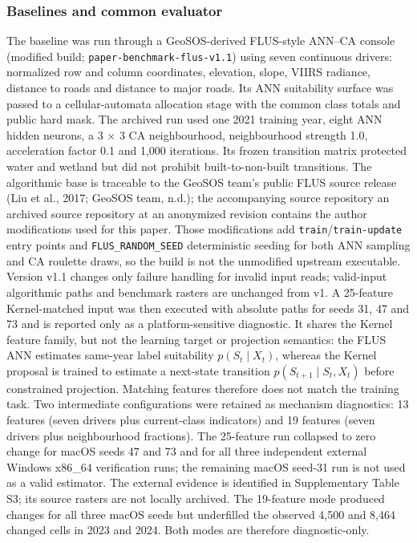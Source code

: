 \documentclass[
]{article}
\begin{document}
\subsubsection{Baselines and common
evaluator}\label{baselines-and-common-evaluator}

The baseline was run through a GeoSOS-derived FLUS-style ANN--CA console
(modified build; \texttt{paper-benchmark-flus-v1.1}) using seven
continuous drivers: normalized row and column coordinates, elevation,
slope, VIIRS radiance, distance to roads and distance to major roads.
Its ANN suitability surface was passed to a cellular-automata allocation
stage with the common class totals and public hard mask. The archived
run used one 2021 training year, eight ANN hidden neurons, a 3 × 3 CA
neighbourhood, neighbourhood strength 1.0, acceleration factor 0.1 and
1,000 iterations. Its frozen transition matrix protected water and
wetland but did not prohibit built-to-non-built transitions. The
algorithmic base is traceable to the GeoSOS team's public FLUS source
release (Liu et al., 2017; GeoSOS team, n.d.); the accompanying source
repository an archived source repository at an anonymized revision
contains the author modifications used for this paper. Those
modifications add \texttt{train}/\texttt{train-update} entry points and
\texttt{FLUS\_RANDOM\_SEED} deterministic seeding for both ANN sampling
and CA roulette draws, so the build is not the unmodified upstream
executable. Version v1.1 changes only failure handling for invalid input
reads; valid-input algorithmic paths and benchmark rasters are unchanged
from v1. A 25-feature Kernel-matched input was then executed with
absolute paths for seeds 31, 47 and 73 and is reported only as a
platform-sensitive diagnostic. It shares the Kernel feature family, but
not the learning target or projection semantics: the FLUS ANN estimates
same-year label suitability \(p(S_t\mid X_t)\), whereas the Kernel
proposal is trained to estimate a next-state transition
\(p(S_{t+1}\mid S_t,X_t)\) before constrained projection. Matching
features therefore does not match the training task. Two intermediate
configurations were retained as mechanism diagnostics: 13 features
(seven drivers plus current-class indicators) and 19 features (seven
drivers plus neighbourhood fractions). The 25-feature run collapsed to
zero change for macOS seeds 47 and 73 and for all three independent
external Windows x86\_64 verification runs; the remaining macOS seed-31
run is not used as a valid estimator. The external evidence is
identified in Supplementary Table S3; its source rasters are not locally
archived. The 19-feature mode produced changes for all three macOS seeds
but underfilled the observed 4,500 and 8,464 changed cells in 2023 and
2024. Both modes are therefore diagnostic-only.
\end{document}
